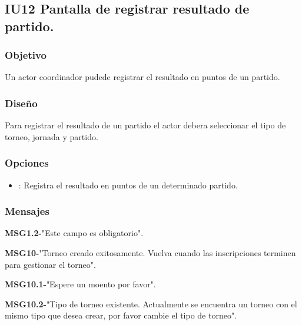 \subsection{IU12 Pantalla de registrar resultado de partido.}

\subsubsection{Objetivo}
	Un actor coordinador pudede registrar el resultado en puntos de un partido.

\subsubsection{Diseño}
  Para registrar el resultado de un partido el actor debera seleccionar el tipo de torneo, jornada y partido.


\subsubsection{Opciones}
\begin{itemize}
	\item {}: Registra el resultado en puntos de un determinado partido.
\end{itemize}

\subsubsection{Mensajes}
	\begin{Citemize}
		\item {\bf MSG1.2-}"Este campo es obligatorio".
		\item {\bf MSG10-}"Torneo creado exitosamente. Vuelva cuando las inscripciones terminen para gestionar el torneo".
		\item {\bf MSG10.1-}"Espere un moento por favor".
		\item {\bf MSG10.2-}"Tipo de torneo existente. Actualmente se encuentra un torneo con el mismo tipo que desea crear, por favor cambie el tipo de torneo".
\end{Citemize}